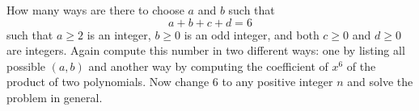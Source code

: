 How many ways are there to choose $a$ and $b$ such that
\[
a + b + c + d = 6
\]
such that $a \geq 2$ is an integer,
$b \geq 0$ is an odd integer,
and both $c \geq 0$ and $d \geq 0$ are integers. 
Again compute this number in two different ways:
one by listing all possible $(a, b)$ and another way by 
computing the coefficient of $x^6$ of the product
of two polynomials.
Now change 6 to any positive integer $n$ and solve the
problem in general.
